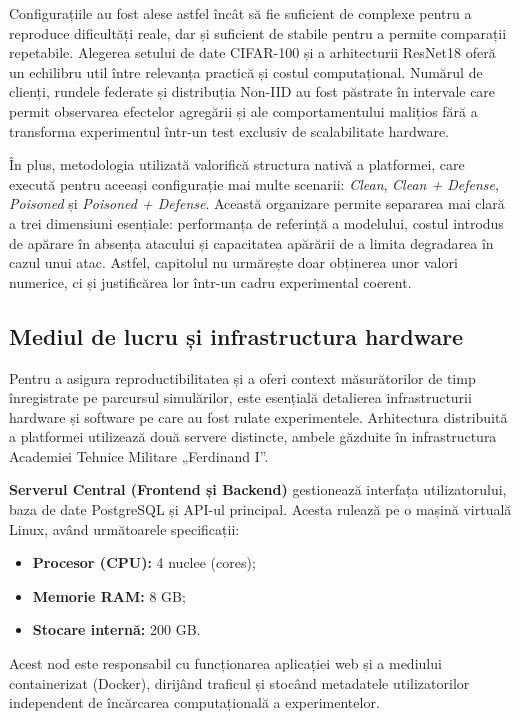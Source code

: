 \documentclass[../../main.tex]{subfiles}
\begin{document}
        Configurațiile au fost alese astfel încât să fie suficient de complexe pentru a reproduce dificultăți reale, dar și suficient de stabile pentru a permite comparații repetabile. Alegerea setului de date CIFAR-100 și a arhitecturii ResNet18 oferă un echilibru util între relevanța practică și costul computațional. Numărul de clienți, rundele federate și distribuția Non-IID au fost păstrate în intervale care permit observarea efectelor agregării și ale comportamentului malițios fără a transforma experimentul într-un test exclusiv de scalabilitate hardware.

        În plus, metodologia utilizată valorifică structura nativă a platformei, care execută pentru aceeași configurație mai multe scenarii: \textit{Clean}, \textit{Clean + Defense}, \textit{Poisoned} și \textit{Poisoned + Defense}. Această organizare permite separarea mai clară a trei dimensiuni esențiale: performanța de referință a modelului, costul introdus de apărare în absența atacului și capacitatea apărării de a limita degradarea în cazul unui atac. Astfel, capitolul nu urmărește doar obținerea unor valori numerice, ci și justificărea lor într-un cadru experimental coerent.

        \subsection{Mediul de lucru și infrastructura hardware}

        Pentru a asigura reproductibilitatea și a oferi context măsurătorilor de timp înregistrate pe parcursul simulărilor, este esențială detalierea infrastructurii hardware și software pe care au fost rulate experimentele. Arhitectura distribuită a platformei utilizează două servere distincte, ambele găzduite în infrastructura Academiei Tehnice Militare „Ferdinand I”.

        \textbf{Serverul Central (Frontend și Backend)} gestionează interfața utilizatorului, baza de date PostgreSQL și API-ul principal. Acesta rulează pe o mașină virtuală Linux, având următoarele specificații:
        \begin{itemize}
            \item \textbf{Procesor (CPU):} 4 nuclee (cores);
            \item \textbf{Memorie RAM:} 8 GB;
            \item \textbf{Stocare internă:} 200 GB.
        \end{itemize}
        Acest nod este responsabil cu funcționarea aplicației web și a mediului containerizat (Docker), dirijând traficul și stocând metadatele utilizatorilor independent de încărcarea computațională a experimentelor.
\end{document}
